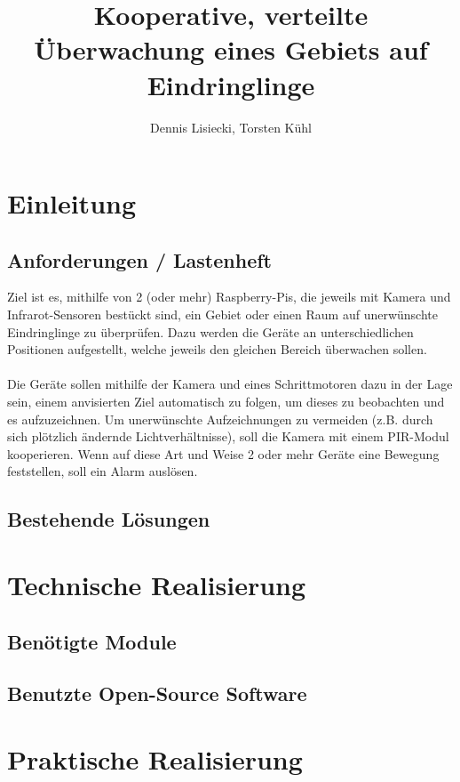 \documentclass[12pt,a4paper]{scrreprt}
\title{Kooperative, verteilte Überwachung eines Gebiets auf Eindringlinge}
\author{Dennis Lisiecki, Torsten Kühl}
\begin{document}
\maketitle	%
\tableofcontents	%

\chapter{Einleitung}
\section{Anforderungen / Lastenheft}
Ziel ist es, mithilfe von 2 (oder mehr) Raspberry-Pis, die jeweils mit Kamera und Infrarot-Sensoren bestückt sind, ein Gebiet oder einen Raum auf unerwünschte Eindringlinge zu überprüfen. 
Dazu werden die Geräte an unterschiedlichen Positionen aufgestellt, welche jeweils den gleichen Bereich überwachen sollen. 
\\
\\
Die Geräte sollen mithilfe der Kamera und eines Schrittmotoren dazu in der Lage sein, einem anvisierten Ziel automatisch zu folgen, um dieses zu beobachten und es aufzuzeichnen. Um unerwünschte Aufzeichnungen zu vermeiden (z.B. durch sich plötzlich ändernde Lichtverhältnisse), soll die Kamera mit einem PIR-Modul kooperieren.
Wenn auf diese Art und Weise 2 oder mehr Geräte eine Bewegung feststellen, soll ein Alarm auslösen.



\section{Bestehende Lösungen}

\chapter{Technische Realisierung}
\section{Benötigte Module}

\section{Benutzte Open-Source Software}

\chapter{Praktische Realisierung}
\end{document}
